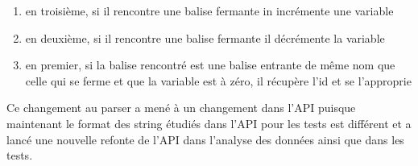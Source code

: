 \begin{enumerate}
\item en troisième, si il rencontre une balise fermante in incrémente une variable
\item en deuxième, si il rencontre une balise fermante il décrémente la variable
\item en premier, si la balise rencontré est une balise entrante de même nom que celle qui se ferme et que la variable est à zéro, il récupère l'id et se l'approprie\\
\end{enumerate}

Ce changement au parser a mené à un changement dans l'API puisque maintenant le format des string étudiés dans l'API pour les tests est différent et a lancé une nouvelle refonte de l'API dans l'analyse des données ainsi que dans les tests.\\